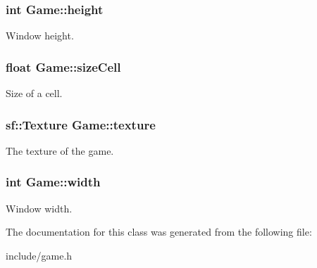 \subsubsection[{height}]{\setlength{\rightskip}{0pt plus 5cm}int Game\+::height\hspace{0.3cm}{\ttfamily [private]}}\hypertarget{classGame_aa6d1743c45de5558a0ca99078df85250}{}\label{classGame_aa6d1743c45de5558a0ca99078df85250}
Window height. 
\subsubsection[{size\+Cell}]{\setlength{\rightskip}{0pt plus 5cm}float Game\+::size\+Cell\hspace{0.3cm}{\ttfamily [private]}}\hypertarget{classGame_a022d477e012d53dde1affab23a93d8fc}{}\label{classGame_a022d477e012d53dde1affab23a93d8fc}
Size of a cell. 
\subsubsection[{texture}]{\setlength{\rightskip}{0pt plus 5cm}sf\+::\+Texture Game\+::texture\hspace{0.3cm}{\ttfamily [private]}}\hypertarget{classGame_a7d3e922aa6ec275e667f86056f83927e}{}\label{classGame_a7d3e922aa6ec275e667f86056f83927e}
The texture of the game. 
\subsubsection[{width}]{\setlength{\rightskip}{0pt plus 5cm}int Game\+::width\hspace{0.3cm}{\ttfamily [private]}}\hypertarget{classGame_a06b5a675d7c0f6a9b58d395872b1a4e7}{}\label{classGame_a06b5a675d7c0f6a9b58d395872b1a4e7}
Window width. 

The documentation for this class was generated from the following file\+:\begin{DoxyCompactItemize}
\item 
include/game.\+h\end{DoxyCompactItemize}
